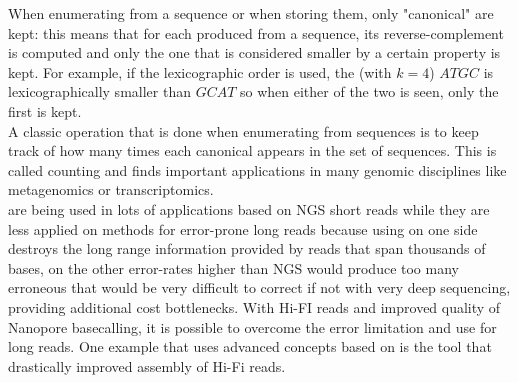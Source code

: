 When enumerating \kmers from a sequence or when storing them, only "canonical" \kmers are kept: this means that for each \kmer produced from a sequence, its reverse-complement is computed and only the one that is considered smaller by a certain property is kept. For example, if the lexicographic order is used, the \kmer (with $k=4$) $ATGC$ is lexicographically smaller than $GCAT$ so when either of the two is seen, only the first is kept.\\
A classic operation that is done when enumerating \kmers from sequences is to keep track of how many times each canonical \kmer appears in the set of sequences. This is called \kmer counting and finds important applications in many genomic disciplines like metagenomics or transcriptomics.\\
\kmers are being used in lots of applications based on NGS short reads while they are less applied on methods for error-prone long reads because using \kmers on one side destroys the long range information provided by reads that span thousands of bases, on the other error-rates higher than NGS would produce too many erroneous \kmers that would be very difficult to correct if not with very deep sequencing, providing additional cost bottlenecks. With Hi-FI reads and improved quality of Nanopore basecalling, it is possible to overcome the error limitation and use \kmers for long reads. One example that uses advanced concepts based on \kmers is the tool \mdbg that drastically improved assembly of Hi-Fi reads.\\ 

